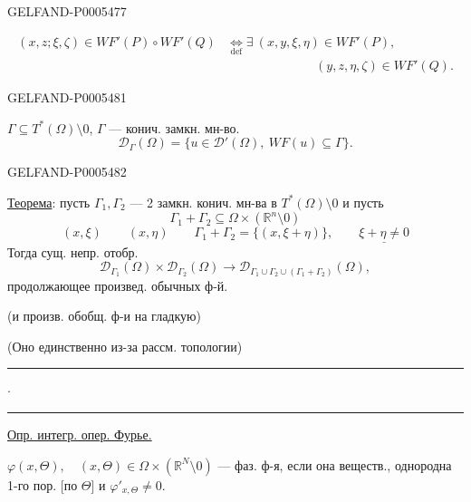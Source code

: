 \begin{GelfandAdjacentEvidence}{GELFAND-P000547}{7}

\[
\begin{aligned}
(x,z;\xi,\zeta)\in WF'(P)\circ WF'(Q)
&\underset{\mathrm{def}}{\Longleftrightarrow}
\exists\ (x,y,\xi,\eta)\in WF'(P),\\
&\hspace{7em}(y,z,\eta,\zeta)\in WF'(Q).
\end{aligned}
\]
\end{GelfandAdjacentEvidence}



\begin{GelfandAdjacentEvidence}{GELFAND-P000548}{1}

\(\Gamma\subseteq T^*(\Omega)\setminus0\), \(\Gamma\) — конич. замкн. мн-во.
\[
\mathcal D_\Gamma(\Omega)=\{u\in\mathcal D'(\Omega),\ WF(u)\subseteq\Gamma\}.
\]
\end{GelfandAdjacentEvidence}
\begin{GelfandAdjacentEvidence}{GELFAND-P000548}{2}

\uline{Теорема}: пусть \(\Gamma_1,\Gamma_2\) — 2 замкн. конич. мн-ва в
\(T^*(\Omega)\setminus0\) и пусть
\[
\Gamma_1+\Gamma_2\subseteq\Omega\times(\mathbb R^n\setminus0)
\]
\[
(x,\xi)\qquad(x,\eta)\qquad
\Gamma_1+\Gamma_2=\{(x,\xi+\eta)\},\qquad\underline{\xi+\eta\ne0}
\]
Тогда сущ. непр. отобр.
\[
\mathcal D_{\Gamma_1}(\Omega)\times\mathcal D_{\Gamma_2}(\Omega)
\longrightarrow\mathcal D_{\Gamma_1\cup\Gamma_2\cup(\Gamma_1+\Gamma_2)}(\Omega),
\]
продолжающее произвед. обычных ф-й.

(и произв. обобщ. ф-и на гладкую)

(Оно единственно из-за рассм. топологии)
\hfill\rule{1.3cm}{.35pt}\enspace\(\cdot\)\enspace\rule{1.3cm}{.35pt}\par

\uline{Опр. интегр. опер. Фурье.}

\(\varphi(x,\Theta),\quad (x,\Theta)\in\Omega\times(\mathbb R^N\setminus0)\)
— фаз. ф-я, если она веществ., однородна 1-го пор. [по \(\Theta\)] и
\(\varphi'_{x,\Theta}\ne0\).
\end{GelfandAdjacentEvidence}
